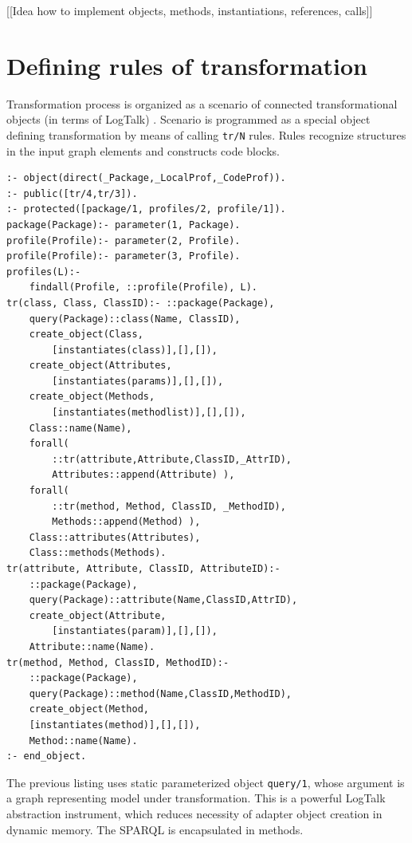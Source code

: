 \documentclass[conference]{IEEEtran}
\begin{document}


[[Idea how to implement objects, methods, instantiations, references, calls]]

\section{Defining rules of transformation}
\label{sec:mda-rules}

Transformation process is organized as a scenario of connected transformational objects (in terms of LogTalk) \cite{tereh1}.  Scenario is programmed as a special object defining transformation by means of calling \verb|tr/N| rules.  Rules recognize structures in the input graph elements and constructs code blocks.

\begin{multicols}{2}
\begin{verbatim}
:- object(direct(_Package,_LocalProf,_CodeProf)).
:- public([tr/4,tr/3]).
:- protected([package/1, profiles/2, profile/1]).
package(Package):- parameter(1, Package).
profile(Profile):- parameter(2, Profile).
profile(Profile):- parameter(3, Profile).
profiles(L):-
    findall(Profile, ::profile(Profile), L).
tr(class, Class, ClassID):- ::package(Package),
    query(Package)::class(Name, ClassID),
    create_object(Class,
        [instantiates(class)],[],[]),
    create_object(Attributes,
        [instantiates(params)],[],[]),
    create_object(Methods,
        [instantiates(methodlist)],[],[]),
    Class::name(Name),
    forall(
        ::tr(attribute,Attribute,ClassID,_AttrID),
        Attributes::append(Attribute) ),
    forall(
        ::tr(method, Method, ClassID, _MethodID),
        Methods::append(Method) ),
    Class::attributes(Attributes),
    Class::methods(Methods).
tr(attribute, Attribute, ClassID, AttributeID):-
    ::package(Package),
    query(Package)::attribute(Name,ClassID,AttrID),
    create_object(Attribute,
        [instantiates(param)],[],[]),
    Attribute::name(Name).
tr(method, Method, ClassID, MethodID):-
    ::package(Package),
    query(Package)::method(Name,ClassID,MethodID),
    create_object(Method,
    [instantiates(method)],[],[]),
    Method::name(Name).
:- end_object.
\end{verbatim}
\end{multicols}

The previous listing uses static parameterized object \verb|query/1|, whose argument is a graph representing model under transformation.  This is a powerful LogTalk abstraction instrument, which reduces necessity of adapter object creation in dynamic memory.  The SPARQL is encapsulated in methods.
\end{document}
